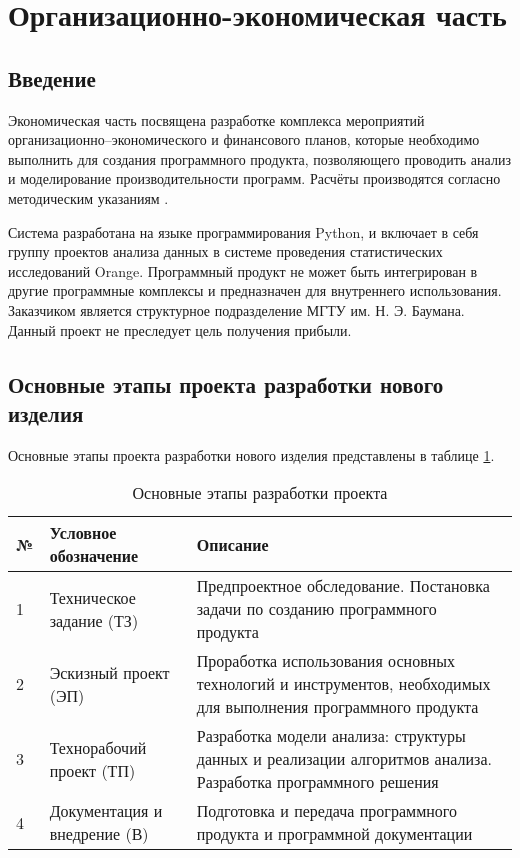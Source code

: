 \section{Организационно-экономическая часть}
\subsection{Введение}
Экономическая часть посвящена разработке комплекса мероприятий организационно–экономического и финансового планов, которые необходимо выполнить для создания программного продукта, позволяющего проводить анализ и моделирование производительности программ. Расчёты производятся согласно методическим указаниям \cite{economics}.

Система разработана на языке программирования Python, и включает в себя группу проектов анализа данных в системе проведения статистических исследований Orange. Программный продукт не может быть интегрирован в другие программные комплексы и предназначен для внутреннего использования. Заказчиком является структурное подразделение МГТУ им. Н. Э. Баумана.
Данный проект не преследует цель получения прибыли.

\subsection{Основные этапы проекта разработки нового изделия}
Основные этапы проекта разработки нового изделия представлены в таблице \ref{tab:development-stages}.

\begin{table}[H]
    \caption{\label{tab:development-stages}Основные этапы разработки проекта}
    \begin{tabular}[H]{|l|p{5cm}|p{8cm}|}
        \hline
        № & Условное обозначение & Описание\\
        \hline
        1 & Техническое задание (ТЗ) & Предпроектное обследование. Постановка задачи по созданию программного продукта\\
        \hline
        2 & Эскизный проект (ЭП) & Проработка использования основных технологий и инструментов, необходимых для выполнения программного продукта\\
        \hline
        3 & Технорабочий проект (ТП) & Разработка модели анализа: структуры данных и реализации алгоритмов анализа. Разработка программного решения\\
        \hline
        4 & Документация и внедрение (В) & Подготовка и передача программного продукта и программной документации\\
        \hline
    \end{tabular}
\end{table}

